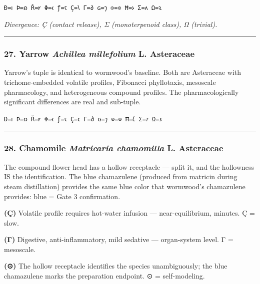 \documentclass[12pt,a4paper]{article}
\begin{document}
\texttt{Ð=𐑦\ Þ=𐑸\ Ř=𐑾\ Φ=𐑬\ ƒ=𐑱\ Ç=𐑘\ Γ=𐑔\ ɢ=𐑠\ ⊙=⊙\ Ħ=𐑶\ Σ=𐑵\ Ω=𐑷}

\emph{Divergence: Ç (contact release), Σ (monoterpenoid class), Ω
(trivial).}

\begin{center}\rule{0.5\linewidth}{0.5pt}\end{center}

\hypertarget{yarrow-achillea-millefolium-l.-asteraceae}{%
\subsubsection{\texorpdfstring{27. Yarrow \textbar{} \emph{Achillea
millefolium} L. \textbar{}
Asteraceae}{27. Yarrow \textbar{} Achillea millefolium L. \textbar{} Asteraceae}}\label{yarrow-achillea-millefolium-l.-asteraceae}}

Yarrow's tuple is identical to wormwood's baseline. Both are Asteraceae
with trichome-embedded volatile profiles, Fibonacci phyllotaxis,
mesoscale pharmacology, and heterogeneous compound profiles. The
pharmacologically significant differences are real and sub-tuple.

\texttt{Ð=𐑦\ Þ=𐑸\ Ř=𐑾\ Φ=𐑬\ ƒ=𐑱\ Ç=𐑤\ Γ=𐑔\ ɢ=𐑠\ ⊙=⊙\ Ħ=𐑖\ Σ=𐑳\ Ω=𐑭}

\begin{center}\rule{0.5\linewidth}{0.5pt}\end{center}

\hypertarget{chamomile-matricaria-chamomilla-l.-asteraceae}{%
\subsubsection{\texorpdfstring{28. Chamomile \textbar{} \emph{Matricaria
chamomilla} L. \textbar{}
Asteraceae}{28. Chamomile \textbar{} Matricaria chamomilla L. \textbar{} Asteraceae}}\label{chamomile-matricaria-chamomilla-l.-asteraceae}}

The compound flower head has a hollow receptacle --- split it, and the
hollowness IS the identification. The blue chamazulene (produced from
matricin during steam distillation) provides the same blue color that
wormwood's chamazulene provides: blue = Gate 3 confirmation.

\textbf{(Ç)} Volatile profile requires hot-water infusion ---
near-equilibrium, minutes. Ç = slow.

\textbf{(Γ)} Digestive, anti-inflammatory, mild sedative ---
organ-system level. Γ = mesoscale.

\textbf{(⊙)} The hollow receptacle identifies the species unambiguously;
the blue chamazulene marks the preparation endpoint. ⊙ = self-modeling.
\end{document}
